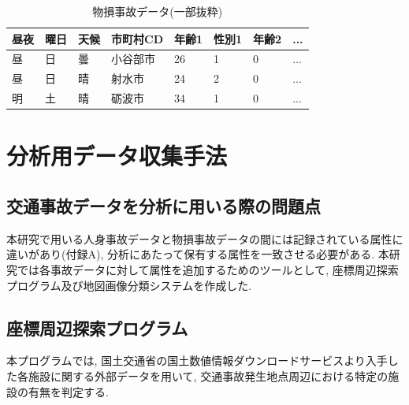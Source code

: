 \documentclass[a4j,8.5pt, twocolumn,fleqn]{jbook}
\begin{document}
\begin{table}[htb]
    \caption{物損事故データ(一部抜粋)}
    \label{物損事故データ}
    \small
    \begin{tabular}{|l|l|l|l|l|l|l|l|}
        \hline
        \textbf{昼夜} & \textbf{曜日} & \textbf{天候} & \textbf{市町村CD} & \textbf{年齢1} & \textbf{性別1} & \textbf{年齢2} & \textbf{...} \\ \hline
        昼           & 日           & 曇           & 小谷部市           & 26              & 1               & 0               & ...          \\ \hline
        昼           & 日           & 晴           & 射水市            & 24              & 2               & 0               & ...          \\ \hline
        明           & 土           & 晴           & 砺波市            & 34              & 1               & 0               & ...          \\ \hline
    \end{tabular}
\end{table}




\section{分析用データ収集手法}
\subsection{交通事故データを分析に用いる際の問題点}
本研究で用いる人身事故データと物損事故データの間には記録されている属性に違いがあり(付録A), 分析にあたって保有する属性を一致させる必要がある. 
本研究では各事故データに対して属性を追加するためのツールとして, 座標周辺探索プログラム及び地図画像分類システムを作成した. 

\subsection{座標周辺探索プログラム}
本プログラムでは, 国土交通省の国土数値情報ダウンロードサービス\cite{国土数値情報ダウンロードサービス}より入手した各施設に関する外部データを用いて, 交通事故発生地点周辺における特定の施設の有無を判定する. 
\end{document}
